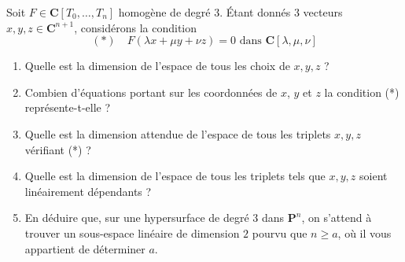 \begin{exercise}
\label{exercise-cubics}
Soit $F \in \mathbf{C}[T_0, \ldots, T_n]$ homogène de degré $3$.
Étant donnés $3$ vecteurs $x, y, z \in \mathbf{C}^{n + 1}$, considérons la condition
$$
(*)\quad
F(\lambda x + \mu y + \nu z) = 0 \text{ dans } \mathbf{C}[\lambda, \mu, \nu]
$$
\begin{enumerate}
\item Quelle est la dimension de l'espace de tous les choix de $x, y, z$ ?
\item Combien d'équations portant sur les coordonnées de $x$, $y$ et $z$
la condition (*) représente-t-elle ?
\item Quelle est la dimension attendue de l'espace de tous les triplets
$x, y, z$ vérifiant (*) ?
\item Quelle est la dimension de l'espace de tous les triplets tels que
$x, y, z$ soient linéairement dépendants ?
\item En déduire que, sur une hypersurface de degré $3$ dans $\mathbf{P}^n$,
on s'attend à trouver un sous-espace linéaire de dimension $2$ pourvu que
$n \geq a$, où il vous appartient de déterminer $a$.
\end{enumerate}
\end{exercise}

